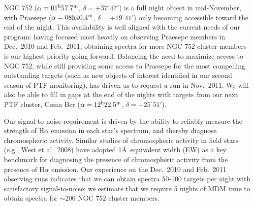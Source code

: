 \feasibility
NGC 752 ($\alpha = 01^{\rm h}57.7^{\rm m}$, $\delta = +37^{\circ}47'$) is a full night object in mid-November, with Praesepe ($\alpha = 08{\rm h}40.4^{\rm m}$, $\delta = +19^{\circ}41'$) only becoming accessible toward the end of the night.  This availability is well aligned with the current needs of our program: having focused most heavily on observing Praesepe members in Dec.\ 2010 and Feb.\ 2011, obtaining spectra for more NGC 752 cluster members is our highest priority going forward.  Balancing the need to maximize access to NGC 752, while still providing some access to Praesepe for the most compelling outstanding targets (such as new objects of interest identified in our second season of PTF monitoring), has driven us to request a run in Nov.\ 2011.  We will also be able to fill in gaps at the end of the nights with targets from our next PTF cluster, Coma Ber ($\alpha = 12^{\rm h}22.5^{\rm m}$, $\delta = +25^{\circ}51'$).

Our signal-to-noise requirement is driven by the ability to reliably measure the strength of H$\alpha$ emission in each star's spectrum, and thereby diagnose chromospheric activity.  Similar studies of chromospheric activity in field stars (e.g., West et al.\ 2008) have adopted 1\AA\ equivalent width (EW) as a key benchmark for diagnosing the presence of chromospheric activity from the presence of H$\alpha$ emission.  %
Our experience on the Dec.\ 2010 and Feb.\ 2011 observing runs indicates that we can obtain spectra 50-100 targets per night with satisfactory signal-to-noise; we estimate that we require 5 nights of MDM time to obtain spectra for $\sim$200 NGC 752 cluster members. 



%
%

